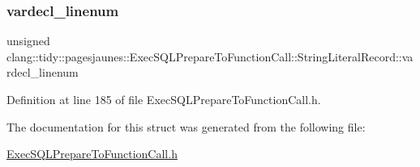 \subsubsection{\texorpdfstring{vardecl\+\_\+linenum}{vardecl\_linenum}}
{\footnotesize\ttfamily unsigned clang\+::tidy\+::pagesjaunes\+::\+Exec\+S\+Q\+L\+Prepare\+To\+Function\+Call\+::\+String\+Literal\+Record\+::vardecl\+\_\+linenum}



Definition at line 185 of file Exec\+S\+Q\+L\+Prepare\+To\+Function\+Call.\+h.



The documentation for this struct was generated from the following file\+:\begin{DoxyCompactItemize}
\item 
\hyperlink{_exec_s_q_l_prepare_to_function_call_8h}{Exec\+S\+Q\+L\+Prepare\+To\+Function\+Call.\+h}\end{DoxyCompactItemize}
